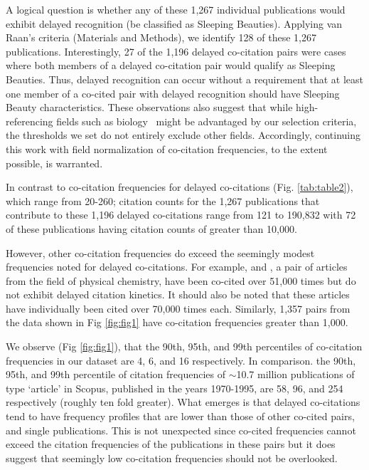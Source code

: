 \documentclass[utf8]{frontiersSCNS}
\begin{document}
A logical question is whether any of these 1,267 individual publications would exhibit delayed recognition (be classified as Sleeping Beauties). Applying van Raan's criteria (Materials and Methods), we identify 128 of these 1,267 publications. Interestingly, 27 of the 1,196 delayed co-citation pairs were cases where both members of a delayed co-citation pair would qualify as Sleeping Beauties. Thus, delayed recognition can occur without a requirement that at least one member of a co-cited pair with delayed recognition should have Sleeping Beauty characteristics. These  observations also suggest that while high-referencing fields such as biology~\citep{Small1980} might be advantaged by our selection criteria, the thresholds we set do not entirely exclude other fields. Accordingly, continuing this work with field normalization of co-citation frequencies, to the extent possible, is warranted.

In contrast to co-citation frequencies for delayed co-citations (Fig. \ref{tab:table2}), which range from 20-260; citation counts for the 1,267 publications that contribute to these 1,196 delayed co-citations range from 121 to 190,832 with 72 of these publications having citation counts of greater than 10,000. 

However, other co-citation frequencies do exceed the seemingly modest frequencies noted for delayed co-citations. For example, \cite{becke_densityfunctional_1993} and \cite{lee_development_1988}, a pair of articles from the field of physical chemistry, have been co-cited over 51,000 times but do not exhibit delayed citation kinetics. It should also be noted that these articles have individually been cited over 70,000 times each. Similarly, 1,357 pairs from the data shown in Fig \ref{fig:fig1} have co-citation frequencies greater than 1,000. 

We observe (Fig \ref{fig:fig1}), that the 90th, 95th, and 99th percentiles of co-citation frequencies in our dataset are 4, 6, and 16 respectively. In comparison. the 90th, 95th, and 99th percentile of citation frequencies of $\sim$10.7 million publications of type `article' in Scopus, published in the years 1970-1995, are 58, 96, and 254 respectively (roughly ten fold greater). What emerges is that delayed co-citations tend to have frequency profiles that are lower than those of other co-cited pairs, and single publications. This is not unexpected since co-cited frequencies cannot exceed the citation frequencies of the publications in these pairs but it does suggest that seemingly low co-citation frequencies should not be overlooked. 
\end{document}
